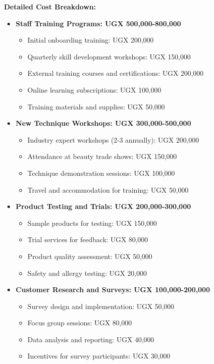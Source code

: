 \textbf{Detailed Cost Breakdown:}
\begin{itemize}[leftmargin=2em]
    \item \textbf{Staff Training Programs: UGX 500,000-800,000}
    \begin{itemize}
        \item Initial onboarding training: UGX 200,000
        \item Quarterly skill development workshops: UGX 150,000
        \item External training courses and certifications: UGX 200,000
        \item Online learning subscriptions: UGX 100,000
        \item Training materials and supplies: UGX 50,000
    \end{itemize}
    
    \item \textbf{New Technique Workshops: UGX 300,000-500,000}
    \begin{itemize}
        \item Industry expert workshops (2-3 annually): UGX 200,000
        \item Attendance at beauty trade shows: UGX 150,000
        \item Technique demonstration sessions: UGX 100,000
        \item Travel and accommodation for training: UGX 50,000
    \end{itemize}
    
    \item \textbf{Product Testing and Trials: UGX 200,000-300,000}
    \begin{itemize}
        \item Sample products for testing: UGX 150,000
        \item Trial services for feedback: UGX 80,000
        \item Product quality assessment: UGX 50,000
        \item Safety and allergy testing: UGX 20,000
    \end{itemize}
    
    \item \textbf{Customer Research and Surveys: UGX 100,000-200,000}
    \begin{itemize}
        \item Survey design and implementation: UGX 50,000
        \item Focus group sessions: UGX 80,000
        \item Data analysis and reporting: UGX 40,000
        \item Incentives for survey participants: UGX 30,000
    \end{itemize}
    

\end{itemize}
